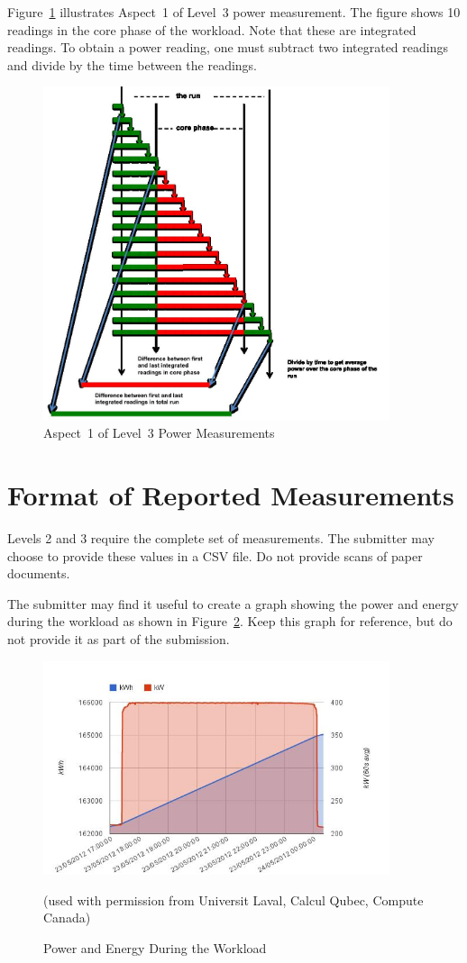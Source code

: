 \noindent
Figure~\ref{fig:a1l3pm} illustrates Aspect~1 of  Level~3 power measurement.
The figure shows 10 readings in the core phase of the workload.
Note that these are integrated readings.
To obtain a power reading, one must subtract two integrated readings and divide by the time between the readings.

\begin{figure}[t]
\centering
\includegraphics[width=4in]{fig3-5}
\caption{Aspect~1 of Level~3 Power Measurements}
\label{fig:a1l3pm}
\end{figure}

\section{Format of Reported Measurements}
\label{sec:FoRM}
\noindent
Levels 2 and 3 require the complete set of measurements.
The submitter may choose to provide these values in a CSV file.
Do not provide scans of paper documents.
\wl

\noindent
The submitter may find it useful to create a graph showing the power and energy during the workload as shown in Figure~\ref{fig:powengwl}.
Keep this graph for reference, but do not provide it as part of the submission.


\begin{figure}
\centering
\includegraphics[width=4in]{fig3-6}
\caption{Power and Energy During the Workload}
(used with permission from Universit Laval, Calcul Qubec, Compute Canada)
\label{fig:powengwl}
\end{figure}


